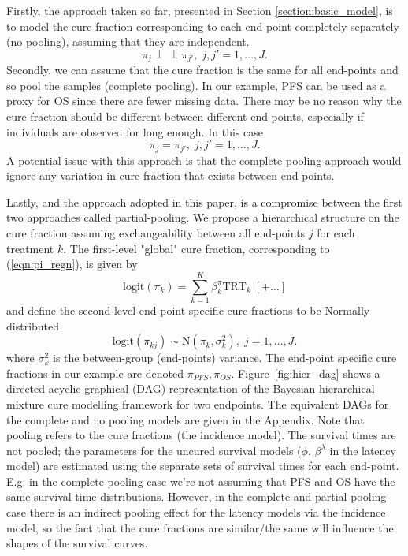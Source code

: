 \documentclass[AMA,STIX1COL]{WileyNJD-v2}
\begin{document}
Firstly, the approach taken so far, presented in Section \ref{section:basic_model}, is to model the cure fraction corresponding to each end-point completely separately (no pooling), assuming that they are independent.
$$
\pi_j \perp\!\!\!\perp \pi_{j'}, \; j,j' = 1, \ldots, J.
$$
Secondly, we can assume that the cure fraction is the same for all end-points and so pool the samples (complete pooling).
In our example, PFS can be used as a proxy for OS since there are fewer missing data.
There may be no reason why the cure fraction should be different between different end-points, especially if individuals are observed for long enough.
In this case
$$
\pi_j = \pi_{j'}, \; j,j' = 1, \ldots, J.
$$
A potential issue with this approach is that the complete pooling approach would ignore any variation in cure fraction that exists between end-points.

Lastly, and the approach adopted in this paper, is a compromise between the first two approaches called partial-pooling.
We propose a hierarchical structure on the cure fraction assuming exchangeability between all end-points $j$ for each treatment $k$.
The first-level "global" cure fraction, corresponding to (\ref{eqn:pi_regn}), is given by
\begin{equation*}
\mbox{logit}(\pi_{k}) = \sum_{k=1}^K \beta^{\pi}_{k} \mbox{TRT}_k \;[+ \ldots]
\end{equation*}
and define the second-level end-point specific cure fractions to be Normally distributed 
$$
\text{logit}(\pi_{kj}) \sim \text{N}(\pi_k, \sigma_k^2), \; j = 1, \ldots, J.  
$$
where $\sigma_k^2$ is the between-group (end-points) variance.
The end-point specific cure fractions in our example are denoted $\pi_{PFS}, \pi_{OS}$.
Figure~\ref{fig:hier_dag} shows a directed acyclic graphical (DAG) representation of the Bayesian hierarchical mixture cure modelling framework for two endpoints.
The equivalent DAGs for the complete and no pooling models are given in the Appendix.
Note that pooling refers to the cure fractions (the incidence model). The survival times are not pooled; the parameters for the uncured survival models ($\phi$, $\beta^{\lambda}$ in the latency model) are estimated using the separate sets of survival times for each end-point.
E.g. in the complete pooling case we're not assuming that PFS and OS have the same survival time distributions.
However, in the complete and partial pooling case there is an indirect pooling effect for the latency models via the incidence model, so the fact that the cure fractions are similar/the same will influence the shapes of the survival curves.
\end{document}
